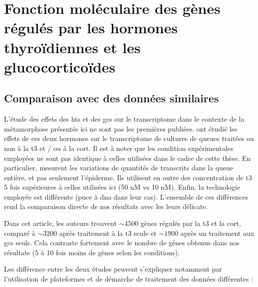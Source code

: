 \documentclass[../main.tex]{subfiles}
\begin{document}
\chapter{Fonction moléculaire des gènes régulés par les hormones thyroïdiennes et les glucocorticoïdes}


\section{Comparaison avec des données similaires}

L'étude des effets des \glspl{ht} et des \glspl{gc} sur le transcriptome dans le contexte de la métamorphose présentés ici ne sont pas les premières publiées.
\citep{Kulkarni2012} ont étudié les effets de ces deux hormones sur le transcriptome de cultures de queues traitées ou non à la \gls{t3} et / ou à la \gls{cort}.
Il est à noter que les condition expérimentales employées ne sont pas identique à celles utilisées dans le cadre de cette thèse.
En particulier, \citep{Kulkarni2012} mesurent les variations de quantités de transcrits dans la queue entière, et pas seulement l'épiderme.
Ils utilisent en outre des concentration de \gls{t3} 5 fois supérieures à celles utilisées ici (50 nM vs 10 nM).
Enfin, la technologie employée est différente (puce à \gls{dna} dans leur cas).
L'ensemble de ces différences rend la comparaison directe de nos résultats avec les leurs délicate.
\par
Dans cet article, les auteurs trouvent $\sim 4500$ gènes régulés par la \gls{t3} et la \gls{cort}, comparé à $\sim 3200$ après traitement à la \gls{t3} seule et $\sim 1900$ après un traitement aux \glspl{gc} seuls.
Cela contraste fortement avec le nombre de gènes obtenus dans nos résultats (5 à 10 fois moins de gènes selon les conditions).
\par
Les différence entre les deux études peuvent s'expliquer notamment par l'utilisation de plateformes et de démarche de traitement des données différentes :
\end{document}
